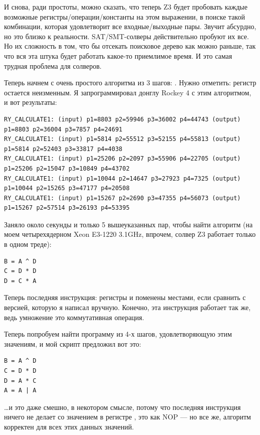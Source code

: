 И снова, ради простоты, можно сказать, что теперь Z3 будет пробовать каждые возможные
регистры/операции/константы на этом выражении, в поиске такой комбинации, которая удовлетворит все входные/выходные пары.
Звучит абсурдно, но это близко к реальности.
SAT/SMT-солверы действительно пробуют их все.
Но их сложность в том, что бы отсекать поисковое дерево как можно раньше, так что вся эта штука будет работать
какое-то приемлимое время.
И это самая трудная проблема для солверов.

Теперь начнем с очень простого алгоритма из 3 шагов: .
Нужно отметить: регистр  остается неизменным.
Я запрограммировал донглу Rockey 4 с этим алгоритмом, и вот результаты:

\begin{lstlisting}
RY_CALCULATE1: (input) p1=8803 p2=59946 p3=36002 p4=44743 (output) p1=8803 p2=36004 p3=7857 p4=24691
RY_CALCULATE1: (input) p1=5814 p2=55512 p3=52155 p4=55813 (output) p1=5814 p2=52403 p3=33817 p4=4038
RY_CALCULATE1: (input) p1=25206 p2=2097 p3=55906 p4=22705 (output) p1=25206 p2=15047 p3=10849 p4=43702
RY_CALCULATE1: (input) p1=10044 p2=14647 p3=27923 p4=7325 (output) p1=10044 p2=15265 p3=47177 p4=20508
RY_CALCULATE1: (input) p1=15267 p2=2690 p3=47355 p4=56073 (output) p1=15267 p2=57514 p3=26193 p4=53395
\end{lstlisting}

Заняло около секунды и только 5 вышеуказанных пар, чтобы найти алгоритм
(на моем четырехядерном Xeon E3-1220 3.1GHz, впрочем, солвер Z3 работает только в одном треде):

\begin{lstlisting}
B = A ^ D
C = D * D
D = C * A
\end{lstlisting}

Теперь последняя инструкция: регистры  и  поменены местами, если сравнить с версией, которую я написал вручную.
Конечно, эта инструкция работает так же, ведь умножение это коммутативная операция.

Теперь попробуем найти программу из 4-х шагов, удовлетворяющую этим значениям, и мой скрипт предложил вот это:

\begin{lstlisting}
B = A ^ D
C = D * D
D = A * C
A = A | A
\end{lstlisting}

\dots и это даже смешно, в некотором смысле, потому что последняя инструкция ничего не делает со значением в регистре ,
это как \ac{NOP} --- но все же, алгоритм корректен для всех этих данных значений.

